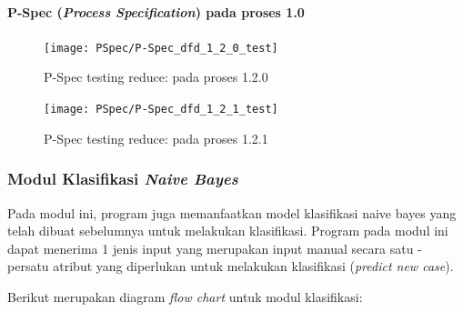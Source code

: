\paragraph{P-Spec (\textit{Process Specification}) pada proses 1.0}

\begin{figure}[H]
	\centering
	\texttt{[image: PSpec/P-Spec\_dfd\_1\_2\_0\_test]}
	\caption[P-Spec testing reduce: pada proses 1.2.0]{P-Spec testing reduce: pada proses 1.2.0}
	\label{fig:P-Spec testing reduce: pada proses 1.2.0}
\end{figure}

\begin{figure}[H]
	\centering
	\texttt{[image: PSpec/P-Spec\_dfd\_1\_2\_1\_test]}
	\caption[P-Spec testing reduce: pada proses 1.2.1]{P-Spec testing reduce: pada proses 1.2.1}
	\label{fig:P-Spec testing reduce: pada proses 1.2.1}
\end{figure}


\subsubsection{Modul Klasifikasi \textit{Naive Bayes}}

Pada modul ini, program juga memanfaatkan model klasifikasi naive bayes yang telah dibuat sebelumnya untuk melakukan klasifikasi. Program pada modul ini dapat menerima 1 jenis input yang merupakan input manual secara satu - persatu atribut yang diperlukan untuk melakukan klasifikasi (\textit{predict new case}).

Berikut merupakan diagram \textit{flow chart} untuk modul klasifikasi:

